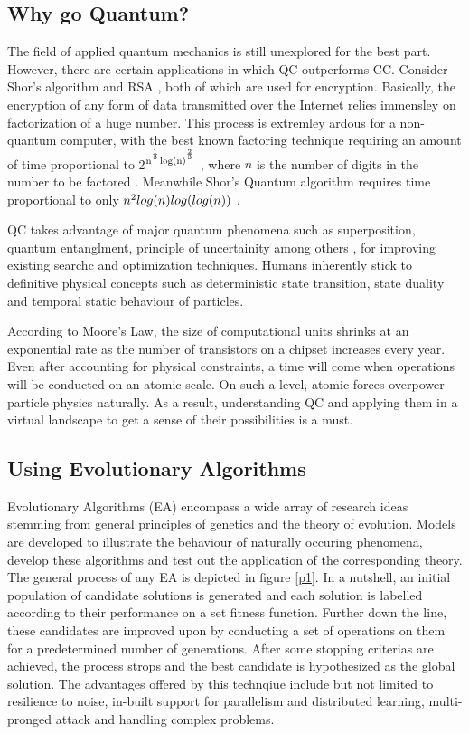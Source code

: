 \documentclass[conference]{IEEEtran}
\newcommand\sufr[3][0pt]{$\rule{0pt}{\dimexpr#1+1.4ex\relax}^\frac{#2}{#3}$}
\begin{document}
\subsection{Why go Quantum?}

The field of applied quantum mechanics is still unexplored for the best part. However, there are certain applications in which QC outperforms CC. Consider Shor's algorithm \cite{shor} and RSA \cite{rsa}, both of which are used for encryption. Basically, the encryption of any form of data transmitted over the Internet relies immensley on factorization of a huge number. This process is extremley ardous for a non-quantum computer, with the best known factoring technique requiring an amount of time proportional to 2$\textsuperscript{n\textsuperscript{\sufr{1}{3}}log(n)\textsuperscript{\sufr{2}{3}}}$ 
, where $\textit{n}$ is the number of digits in the number to be factored \cite{guo}. Meanwhile Shor's Quantum algorithm requires time proportional to only $n\textsuperscript{2}log(n)log(log(n))$ \cite{ham}. 

QC takes advantage of major quantum phenomena such as superposition, quantum entanglment, principle of uncertainity among others \cite{az}, for improving existing searchc and optimization techniques. Humans inherently stick to definitive physical concepts such as deterministic state transition, state duality and temporal static behaviour of particles. 

According to Moore's Law, the size of computational units shrinks at an exponential rate as the number of transistors on a chipset increases every year. Even after accounting for physical constraints, a time will come when operations will be conducted on an atomic scale. On such a level, atomic forces overpower particle physics naturally. As a result, understanding QC and applying them in a virtual landscape to get a sense of their possibilities is a must. 

\subsection{Using Evolutionary Algorithms}

Evolutionary Algorithms (EA) \cite{vik} encompass a wide array of research ideas stemming from general principles of genetics and the theory of evolution. Models are developed to illustrate the behaviour of naturally occuring phenomena, develop these algorithms and test out the application of the corresponding theory. The general process of any EA is depicted in figure \ref{p1}. In a nutshell, an initial population of candidate solutions is generated and each solution is labelled according to their performance on a set fitness function. Further down the line, these candidates are improved upon by conducting a set of operations on them for a predetermined number of generations. After some stopping criterias are achieved, the process strops and the best candidate is hypothesized as the global solution. The advantages offered by this technqiue include but not limited to resilience to noise, in-built support for parallelism and distributed learning, multi-pronged attack and handling complex problems. 
\end{document}
